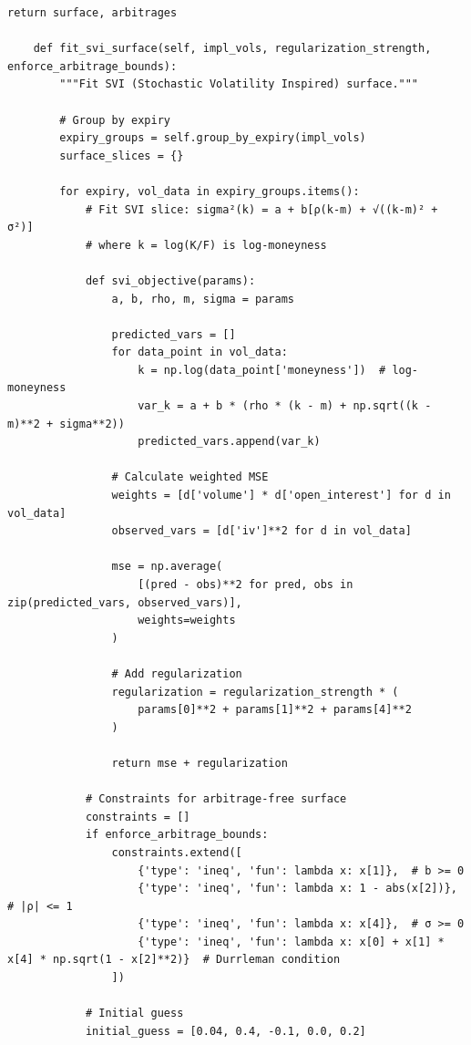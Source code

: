 \documentclass[12pt,a4paper]{article}
\theoremstyle{definition}
\theoremstyle{remark}
\begin{document}
\begin{lstlisting}[caption=Real-Time Volatility Surface Engine]
        return surface, arbitrages
    
    def fit_svi_surface(self, impl_vols, regularization_strength, enforce_arbitrage_bounds):
        """Fit SVI (Stochastic Volatility Inspired) surface."""
        
        # Group by expiry
        expiry_groups = self.group_by_expiry(impl_vols)
        surface_slices = {}
        
        for expiry, vol_data in expiry_groups.items():
            # Fit SVI slice: sigma²(k) = a + b[ρ(k-m) + √((k-m)² + σ²)]
            # where k = log(K/F) is log-moneyness
            
            def svi_objective(params):
                a, b, rho, m, sigma = params
                
                predicted_vars = []
                for data_point in vol_data:
                    k = np.log(data_point['moneyness'])  # log-moneyness
                    var_k = a + b * (rho * (k - m) + np.sqrt((k - m)**2 + sigma**2))
                    predicted_vars.append(var_k)
                
                # Calculate weighted MSE
                weights = [d['volume'] * d['open_interest'] for d in vol_data]
                observed_vars = [d['iv']**2 for d in vol_data]
                
                mse = np.average(
                    [(pred - obs)**2 for pred, obs in zip(predicted_vars, observed_vars)],
                    weights=weights
                )
                
                # Add regularization
                regularization = regularization_strength * (
                    params[0]**2 + params[1]**2 + params[4]**2
                )
                
                return mse + regularization
            
            # Constraints for arbitrage-free surface
            constraints = []
            if enforce_arbitrage_bounds:
                constraints.extend([
                    {'type': 'ineq', 'fun': lambda x: x[1]},  # b >= 0
                    {'type': 'ineq', 'fun': lambda x: 1 - abs(x[2])},  # |ρ| <= 1
                    {'type': 'ineq', 'fun': lambda x: x[4]},  # σ >= 0
                    {'type': 'ineq', 'fun': lambda x: x[0] + x[1] * x[4] * np.sqrt(1 - x[2]**2)}  # Durrleman condition
                ])
            
            # Initial guess
            initial_guess = [0.04, 0.4, -0.1, 0.0, 0.2]
            

\end{lstlisting}
\end{document}
